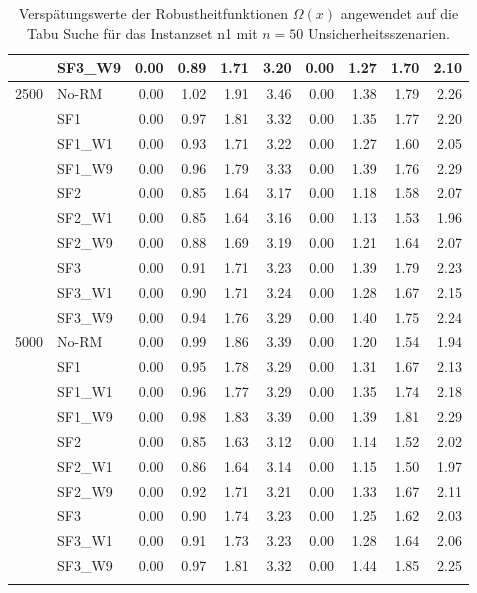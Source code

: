 {\begin{longtable}{ll|rrrr|rrrr}
     & SF3\_W9 & 0.00 & 0.89 & 1.71 & 3.20 & 0.00 & 1.27 & 1.70 & 2.10 \\ \hline
2500 & No-RM & 0.00 & 1.02 & 1.91 & 3.46 & 0.00 & 1.38 & 1.79 & 2.26 \\
     & SF1 & 0.00 & 0.97 & 1.81 & 3.32 & 0.00 & 1.35 & 1.77 & 2.20 \\
     & SF1\_W1 & 0.00 & 0.93 & 1.71 & 3.22 & 0.00 & 1.27 & 1.60 & 2.05 \\
     & SF1\_W9 & 0.00 & 0.96 & 1.79 & 3.33 & 0.00 & 1.39 & 1.76 & 2.29 \\
     & SF2 & 0.00 & 0.85 & 1.64 & 3.17 & 0.00 & 1.18 & 1.58 & 2.07 \\
     & SF2\_W1 & 0.00 & 0.85 & 1.64 & 3.16 & 0.00 & 1.13 & 1.53 & 1.96 \\
     & SF2\_W9 & 0.00 & 0.88 & 1.69 & 3.19 & 0.00 & 1.21 & 1.64 & 2.07 \\
     & SF3 & 0.00 & 0.91 & 1.71 & 3.23 & 0.00 & 1.39 & 1.79 & 2.23 \\
     & SF3\_W1 & 0.00 & 0.90 & 1.71 & 3.24 & 0.00 & 1.28 & 1.67 & 2.15 \\
     & SF3\_W9 & 0.00 & 0.94 & 1.76 & 3.29 & 0.00 & 1.40 & 1.75 & 2.24 \\ \hline
5000 & No-RM & 0.00 & 0.99 & 1.86 & 3.39 & 0.00 & 1.20 & 1.54 & 1.94 \\
     & SF1 & 0.00 & 0.95 & 1.78 & 3.29 & 0.00 & 1.31 & 1.67 & 2.13 \\
     & SF1\_W1 & 0.00 & 0.96 & 1.77 & 3.29 & 0.00 & 1.35 & 1.74 & 2.18 \\
     & SF1\_W9 & 0.00 & 0.98 & 1.83 & 3.39 & 0.00 & 1.39 & 1.81 & 2.29 \\
     & SF2 & 0.00 & 0.85 & 1.63 & 3.12 & 0.00 & 1.14 & 1.52 & 2.02 \\
     & SF2\_W1 & 0.00 & 0.86 & 1.64 & 3.14 & 0.00 & 1.15 & 1.50 & 1.97 \\
     & SF2\_W9 & 0.00 & 0.92 & 1.71 & 3.21 & 0.00 & 1.33 & 1.67 & 2.11 \\
     & SF3 & 0.00 & 0.90 & 1.74 & 3.23 & 0.00 & 1.25 & 1.62 & 2.03 \\
     & SF3\_W1 & 0.00 & 0.91 & 1.73 & 3.23 & 0.00 & 1.28 & 1.64 & 2.06 \\
     & SF3\_W9 & 0.00 & 0.97 & 1.81 & 3.32 & 0.00 & 1.44 & 1.85 & 2.25 \\
\bottomrule
\caption{Verspätungswerte der Robustheitfunktionen $\Omega(x)$ angewendet auf die Tabu Suche für das Instanzset n1 mit $n = 50$ Unsicherheitsszenarien. }
\label{tab:evaluation_robustness_n1}
\end{longtable}
}
\vspace*{-25px}
\begin{figure}[H]
\end{figure}

